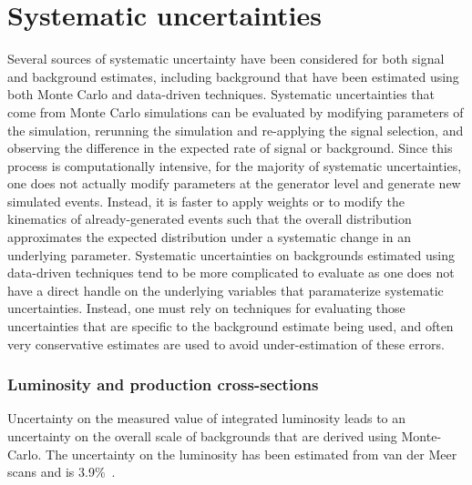 
\section{Systematic uncertainties}\label{sect:syst}
Several sources of systematic uncertainty have been considered for both signal and background estimates,
including background that have been estimated using both Monte Carlo and data-driven techniques.
Systematic uncertainties that come from Monte Carlo simulations can be evaluated by modifying parameters of the simulation,
rerunning the simulation and re-applying the signal selection, and observing the difference in the expected rate of signal or background.
Since this process is computationally intensive, for the majority of systematic uncertainties,
one does not actually modify parameters at the generator level and generate new simulated events.
Instead, it is faster to apply weights or to modify the kinematics of already-generated events
such that the overall distribution approximates the  expected distribution under a systematic change
in an underlying parameter.
Systematic uncertainties on backgrounds estimated using data-driven techniques tend to be more complicated to evaluate
as one does not have a direct handle on the underlying variables that paramaterize systematic uncertainties.
Instead, one must rely on techniques for evaluating those uncertainties that are specific to the background estimate being used, 
and often very conservative estimates are used to avoid under-estimation of these errors.


\subsubsection{Luminosity and production cross-sections}
Uncertainty on the measured value of integrated luminosity leads to an uncertainty on the overall scale of backgrounds that are derived using Monte-Carlo.
The uncertainty on the luminosity has been estimated from van der Meer scans and is 3.9\%~\cite{Aad:2011dr,ATLAS-CONF-2011-116}. 


